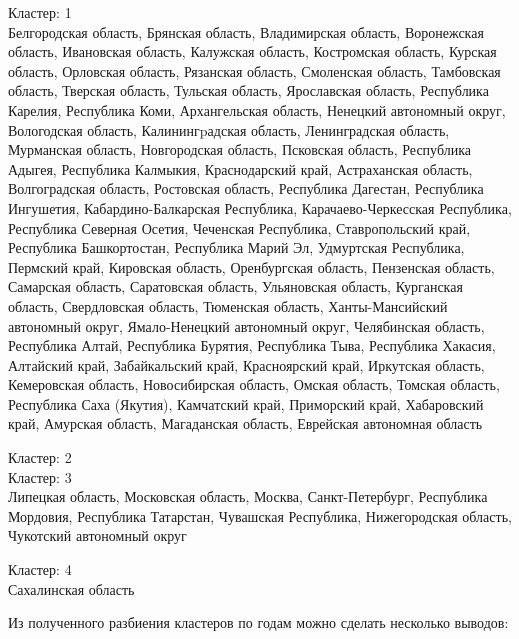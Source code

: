 \documentclass[11pt]{article}
\begin{document}
\begin{itemize}
Кластер:  1 \\
Белгородская область, Брянская область, Владимирская область, Воронежская область, Ивановская область, Калужская область, Костромская область, Курская область, Орловская область, Рязанская область, Смоленская область, Тамбовская область, Тверская область, Тульская область, Ярославская область, Республика Карелия, Республика Коми, Архангельская область, Ненецкий автономный округ, Вологодская область, Калинингpадская область, Ленинградская область, Мурманская область, Новгородская область, Псковская область, Республика Адыгея, Республика Калмыкия, Краснодарский край, Астраханская область, Волгоградская область, Ростовская область, Республика Дагестан, Республика Ингушетия, Кабардино-Балкарская Республика, Карачаево-Черкесская Республика, Республика Северная Осетия, Чеченская Республика, Ставропольский край, Республика Башкортостан, Республика Марий Эл, Удмуртская Республика, Пермский край, Кировская область, Оренбургская область, Пензенская область, Самарская область, Саратовская область, Ульяновская область, Курганская область, Свердловская область, Тюменская область, Ханты-Мансийский автономный округ, Ямало-Ненецкий автономный округ, Челябинская область, Республика Алтай, Республика Бурятия, Республика Тыва, Республика Хакасия, Алтайский край, Забайкальский край, Красноярский край, Иркутская область, Кемеровская область, Новосибирская область, Омская область, Томская область, Республика Саха (Якутия), Камчатский край, Приморский край, Хабаровский край, Амурская область, Магаданская область, Еврейская автономная область

Кластер:  2 \\


Кластер:  3 \\
Липецкая область, Московская область, Москва, Санкт-Петербург, Республика Мордовия, Республика Татарстан, Чувашская Республика, Нижегородская область, Чукотский автономный округ

Кластер:  4 \\
Сахалинская область
\end{itemize}


    Из полученного разбиения кластеров по годам можно сделать несколько
выводов:
\end{document}
